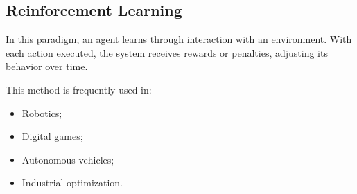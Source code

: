 \subsection{Reinforcement Learning}

In this paradigm, an agent learns through interaction with an environment. With each action
executed, the system receives rewards or penalties, adjusting its behavior over
time.

This method is frequently used in:

\begin{itemize}
    \item Robotics;
    \item Digital games;
    \item Autonomous vehicles;
    \item Industrial optimization.
\end{itemize} 